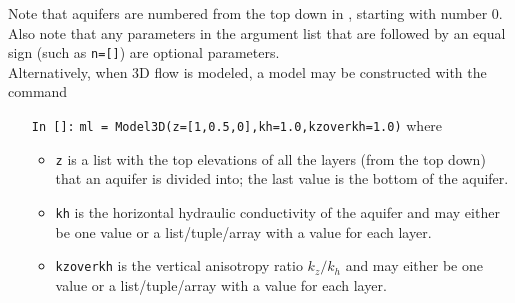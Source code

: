 \documentclass [10pt,letterpaper] {article}
\begin{document}
Note that aquifers are numbered from the top down in \Tim, starting with number
0. Also note that any parameters in the argument list that are followed by an equal sign
(such as {\tt n=[]}) are optional parameters.
\\Alternatively, when 3D flow is modeled, a model may be constructed with the
command
\begin{itemize}
\item[{\tt In []:}] {\tt ml = Model3D(z=[1,0.5,0],kh=1.0,kzoverkh=1.0)} where
    \begin{itemize}
    \item {\tt z} is a list with the top elevations of all the layers (from the top down) that an aquifer is divided
    into; the last value is the bottom of the aquifer.
    \item {\tt kh} is the horizontal hydraulic conductivity of the aquifer and may either be one value or a list/tuple/array with a value for each layer.
    \item {\tt kzoverkh} is the vertical anisotropy ratio $k_z/k_h$ and may either be one value or a list/tuple/array with a value for each layer.
    \end{itemize}
\end{itemize}
\end{document}
